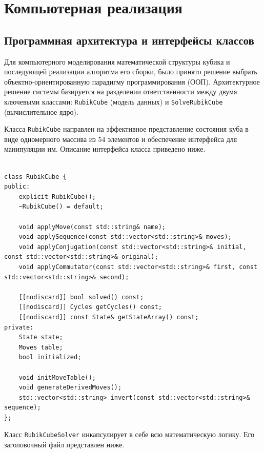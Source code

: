 \documentclass{article}
\begin{document}
\newpage

\section{Компьютерная реализация}

\subsection{Программная архитектура и интерфейсы классов}

Для компьютерного моделирования математической структуры кубика и последующей реализации алгоритма его сборки, было принято решение выбрать объектно-ориентированную парадигму программирования (ООП). Архитектурное решение системы базируется на разделении ответственности между двумя ключевыми классами: \texttt{RubikCube} (модель данных) и \texttt{SolveRubikCube} (вычислительное ядро).

Класса \texttt{RubikCube} направлен на эффективное представление состояния куба в виде одномерного массива из 54 элементов и обеспечение интерфейса для манипуляции им. Описание интерфейса класса приведено ниже.

\begin{lstlisting}[caption={Интерфейс класса модели кубика Рубика}, label={lst:cube_h}]

class RubikCube {
public:
    explicit RubikCube();
    ~RubikCube() = default;

    void applyMove(const std::string& name);
    void applySequence(const std::vector<std::string>& moves);
    void applyConjugation(const std::vector<std::string>& initial, const std::vector<std::string>& original);
    void applyCommutator(const std::vector<std::string>& first, const std::vector<std::string>& second);

    [[nodiscard]] bool solved() const;
    [[nodiscard]] Cycles getCycles() const;
    [[nodiscard]] const State& getStateArray() const;
private:
    State state;
    Moves table;
    bool initialized;

    void initMoveTable();
    void generateDerivedMoves();
    std::vector<std::string> invert(const std::vector<std::string>& sequence);
};

\end{lstlisting}

Класс \texttt{RubikCubeSolver} инкапсулирует в себе всю математическую логику. Его заголовочный файл представлен ниже.

\newpage
\end{document}
